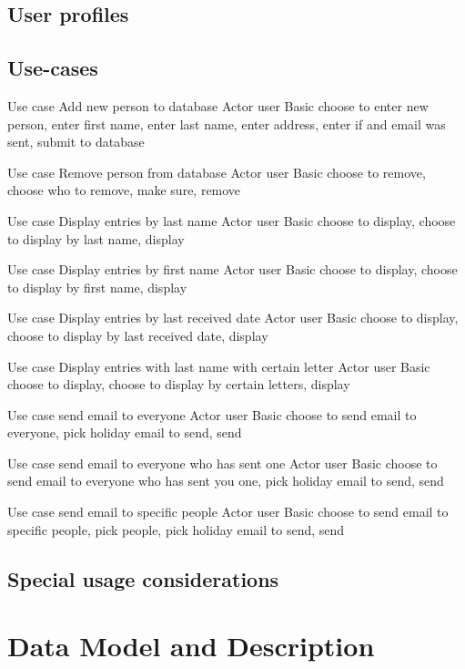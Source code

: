 \documentclass{article}
\begin{document}
\subsection{User profiles}


\subsection{Use-cases}
Use case Add new person to database
Actor user
Basic choose to enter new person, enter first name, enter last name, enter address, enter if and email was sent, submit to database

Use case Remove person from database
Actor user
Basic choose to remove, choose who to remove, make sure, remove
 
Use case Display entries by last name
Actor user
Basic choose to display, choose to display by last name, display
 
Use case Display entries by first name
Actor user
Basic choose to display, choose to display by first name, display

Use case Display entries by last received date
Actor user
Basic choose to display, choose to display by last received date, display
 
Use case Display entries with last name with certain letter
Actor user
Basic choose to display, choose to display by certain letters, display
 
Use case send email to everyone
Actor user
Basic choose to send email to everyone, pick holiday email to send, send
 
Use case send email to everyone who has sent one
Actor user
Basic choose to send email to everyone who has sent you one, pick holiday email to send, send
 
Use case send email to specific people
Actor user
Basic choose to send email to specific people, pick people, pick holiday email to send, send


\subsection{Special usage considerations}

\section{Data Model and Description}
\end{document}
